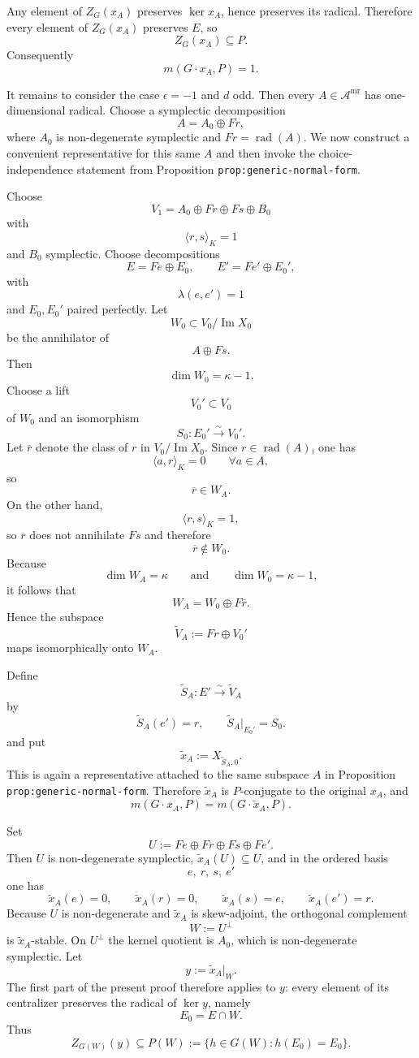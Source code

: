 \documentclass[
  11pt,
]{article}
\begin{document}
Any element of \(Z_G(x_A)\) preserves \(\ker x_A\), hence preserves its
radical. Therefore every element of \(Z_G(x_A)\) preserves \(E\), so \[
Z_G(x_A)\subseteq P.
\] Consequently \[
m(G\cdot x_A,P)=1.
\]

It remains to consider the case \(\epsilon=-1\) and \(d\) odd. Then
every \(A\in \mathscr A^{\mathrm{mr}}\) has one-dimensional radical.
Choose a symplectic decomposition \[
A=A_0\oplus Fr,
\] where \(A_0\) is non-degenerate symplectic and
\(Fr=\operatorname{rad}(A)\). We now construct a convenient
representative for this same \(A\) and then invoke the
choice-independence statement from Proposition
\texttt{prop:generic-normal-form}.

Choose \[
V_1=A_0\oplus Fr\oplus Fs\oplus B_0
\] with \[
\langle r,s\rangle_K=1
\] and \(B_0\) symplectic. Choose decompositions \[
E=Fe\oplus E_0,
\qquad
E'=Fe'\oplus E_0',
\] with \[
\lambda(e,e')=1
\] and \(E_0,E_0'\) paired perfectly. Let \[
W_0\subset V_0/\operatorname{Im} X_0
\] be the annihilator of \[
A\oplus Fs.
\] Then \[
\dim W_0=\kappa-1.
\] Choose a lift \[
V_0'\subset V_0
\] of \(W_0\) and an isomorphism \[
S_0:E_0'\xrightarrow{\sim} V_0'.
\] Let \(\overline r\) denote the class of \(r\) in
\(V_0/\operatorname{Im} X_0\). Since \(r\in \operatorname{rad}(A)\), one
has \[
\langle a,r\rangle_K=0
\qquad \forall a\in A,
\] so \[
\overline r\in W_A.
\] On the other hand, \[
\langle r,s\rangle_K=1,
\] so \(\overline r\) does not annihilate \(Fs\) and therefore \[
\overline r\notin W_0.
\] Because \[
\dim W_A=\kappa
\qquad\text{and}\qquad
\dim W_0=\kappa-1,
\] it follows that \[
W_A=W_0\oplus F\overline r.
\] Hence the subspace \[
\widetilde V_A:=Fr\oplus V_0'
\] maps isomorphically onto \(W_A\).

Define \[
\widetilde S_A:E'\xrightarrow{\sim} \widetilde V_A
\] by \[
\widetilde S_A(e')=r,
\qquad
\widetilde S_A|_{E_0'}=S_0.
\] and put \[
\widetilde x_A:=X_{\widetilde S_A,0}.
\] This is again a representative attached to the same subspace \(A\) in
Proposition \texttt{prop:generic-normal-form}. Therefore
\(\widetilde x_A\) is \(P\)-conjugate to the original \(x_A\), and \[
m(G\cdot x_A,P)=m(G\cdot \widetilde x_A,P).
\]

Set \[
U:=Fe\oplus Fr\oplus Fs\oplus Fe'.
\] Then \(U\) is non-degenerate symplectic,
\(\widetilde x_A(U)\subseteq U\), and in the ordered basis \[
e,\ r,\ s,\ e'
\] one has \[
\widetilde x_A(e)=0,\qquad \widetilde x_A(r)=0,\qquad \widetilde x_A(s)=e,\qquad \widetilde x_A(e')=r.
\] Because \(U\) is non-degenerate and \(\widetilde x_A\) is
skew-adjoint, the orthogonal complement \[
W:=U^\perp
\] is \(\widetilde x_A\)-stable. On \(U^\perp\) the kernel quotient is
\(A_0\), which is non-degenerate symplectic. Let \[
y:=\widetilde x_A|_W.
\] The first part of the present proof therefore applies to \(y\): every
element of its centralizer preserves the radical of \(\ker y\), namely
\[
E_0=E\cap W.
\] Thus \[
Z_{G(W)}(y)\subseteq P(W):=\{h\in G(W):h(E_0)=E_0\}.
\]
\end{document}
